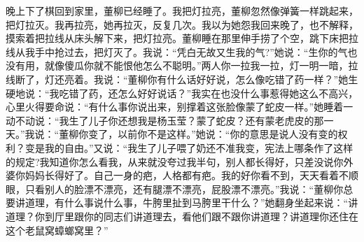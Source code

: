 \documentclass[12pt,oneside]{book}
\begin{document}
晚上下了棋回到家里，董柳已经睡了。我把灯拉亮，董柳忽然像弹簧一样跳起来，把灯拉灭。我再拉亮，她再拉灭，反复几次。我以为她怨我回来晚了，也不解释，摸索着把拉线从床头解下来，把灯拉亮。董柳睡在那里伸手捞了个空，跳下床把拉线从我手中抢过去，把灯灭了。我说：``凭白无故又生我的气?''她说：``生你的气也没有用，就像傻瓜你就不能恨他怎么不聪明。''两人你一拉我一拉，灯一明一暗，拉线断了，灯还亮着。我说：``董柳你有什么话好好说，怎么像吃错了药一样？''她生硬地说：``我吃错了药，还怎么好好说话？''我实在也没什么事惹得她这么不高兴，心里火得要命说：``有什么事你说出来，别撑着这张脸像蒙了蛇皮一样。''她睡着一动不动说：``我生了儿子你还想我是杨玉莹？蒙了蛇皮？还有蒙老虎皮的那一天。''我说：``董柳你变了，以前你不是这样。''她说：``你的意思是说人没有变的权利？变是我的自由。''又说：``我生了儿子喂了奶还不准我变，宪法上哪条作了这样的规定?我知道你怎么看我，从来就没夸过我半句，别人都长得好，只差没说你外婆你妈妈长得好了。自己一身的疤，人格都有疤。我的好你看不到，天天看着不顺眼，只看别人的脸漂不漂亮，还有腿漂不漂亮，屁股漂不漂亮。''我说：``董柳你总要讲道理，有什么事说什么事，牛胯里扯到马胯里干什么？''她翻身坐起来说：``讲道理？你到厅里跟你的同志们讲道理去，看他们跟不跟你讲道理？讲道理你还住在这个老鼠窝蟑螂窝里？''
\end{document}
